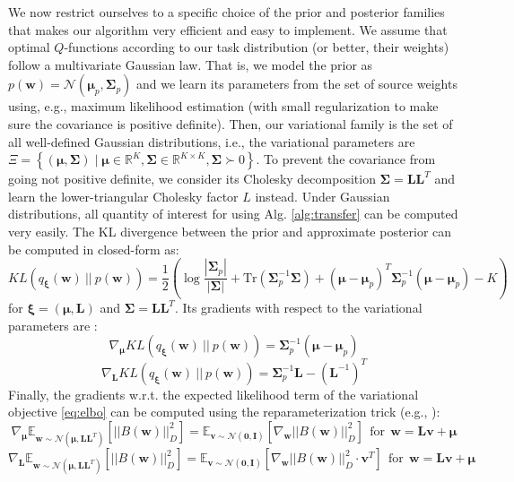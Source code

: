 \documentclass{article}
\begin{document}
We now restrict ourselves to a specific choice of the prior and posterior families that makes our algorithm very efficient and easy to implement. We assume that optimal $Q$-functions according to our task distribution (or better, their weights) follow a multivariate Gaussian law. That is, we model the prior as $p(\bm{w}) = \mathcal{N}(\bm{\mu}_p,\bm{\Sigma}_p)$ and we learn its parameters from the set of source weights using, e.g., maximum likelihood estimation (with small regularization to make sure the covariance is positive definite). Then, our variational family is the set of all well-defined Gaussian distributions, i.e., the variational parameters are $\Xi = \left\{ (\bm{\mu},\bm{\Sigma}) \mid \bm{\mu}\in\mathbb{R}^K, \bm{\Sigma}\in\mathbb{R}^{K\times K}, \bm{\Sigma}\succ 0 \right\}$. To prevent the covariance from going not positive definite, we consider its Cholesky decomposition $\bm{\Sigma} = \bm{LL}^T$ and learn the lower-triangular Cholesky factor $L$ instead. Under Gaussian distributions, all quantity of interest for using Alg. \ref{alg:transfer} can be computed very easily. The KL divergence between the prior and approximate posterior can be computed in closed-form as:
\begin{equation}
KL\left(q_{\bm{\xi}}(\bm{w})\ ||\ p(\bm{w})\right) = \frac{1}{2}\left( \log\frac{\left\lvert \bm{\Sigma}_p \right\rvert}{\left\lvert \bm{\Sigma} \right\rvert} + \text{Tr}\left( \bm{\Sigma}_p^{-1}\bm{\Sigma} \right) + (\bm{\mu} - \bm{\mu}_p)^T \bm{\Sigma}_p^{-1} (\bm{\mu} - \bm{\mu}_p) -K \right)
\end{equation}
for $\bm{\xi} = (\bm{\mu},\bm{L})$ and $\bm{\Sigma} = \bm{LL}^T$. Its gradients with respect to the variational parameters are \cite{}:
\begin{equation}
\nabla_{\bm{\mu}} KL\left(q_{\bm{\xi}}(\bm{w})\ ||\ p(\bm{w})\right) = \bm{\Sigma}_p^{-1} (\bm{\mu} - \bm{\mu}_p)
\end{equation}
\begin{equation}
\nabla_{\bm{L}} KL\left(q_{\bm{\xi}}(\bm{w})\ ||\ p(\bm{w})\right) = \bm{\Sigma}_p^{-1}\bm{L} - (\bm{L}^{-1})^T
\end{equation}
Finally, the gradients w.r.t. the expected likelihood term of the variational objective \eqref{eq:elbo} can be computed using the reparameterization trick (e.g., \cite{}):
\begin{equation}
\nabla_{\bm{\mu}} \mathbb{E}_{\bm{w} \sim \mathcal{N}(\bm{\mu},\bm{LL}^T)}\left[ ||B(\bm{w})||_{D}^2 \right] = \mathbb{E}_{\bm{v} \sim \mathcal{N}(\bm{0},\bm{I})}\left[ \nabla_{\bm{w}} ||B(\bm{w})||_{D}^2 \right]\ \ \text{for}\ \ \bm{w} = \bm{Lv} + \bm{\mu}
\end{equation}
\begin{equation}
\nabla_{\bm{L}} \mathbb{E}_{\bm{w} \sim \mathcal{N}(\bm{\mu},\bm{LL}^T)}\left[ ||B(\bm{w})||_{D}^2 \right] = \mathbb{E}_{\bm{v} \sim \mathcal{N}(\bm{0},\bm{I})}\left[ \nabla_{\bm{w}} ||B(\bm{w})||_{D}^2 \cdot \bm{v}^T \right]\ \ \text{for}\ \ \bm{w} = \bm{Lv} + \bm{\mu}
\end{equation}
\end{document}

